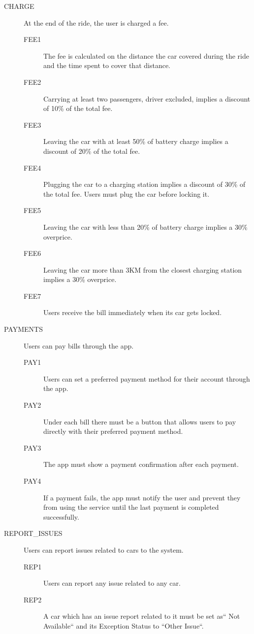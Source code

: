 \documentclass[11pt]{article} %
\begin{document}
\begin{description}
 	\item[CHARGE] At the end of the ride, the user is charged a fee.
	\begin{description}
	\item[FEE1] The fee is calculated on the distance the car covered during the ride and the time spent to cover that distance.
	\item[FEE2] Carrying at least two passengers, driver excluded, implies a discount of 10\% of the total fee.
	\item[FEE3] Leaving the car with at least 50\% of battery charge implies a discount of 20\% of the total fee.
	\item[FEE4] Plugging the car to a charging station implies a discount of 30\% of the total fee. Users must plug the car before locking it.
	\item[FEE5] Leaving the car with less than 20\% of battery charge implies a 30\% overprice.
	\item[FEE6] Leaving the car more than 3KM from the closest charging station implies a 30\% overprice.
	\item[FEE7] Users receive the bill immediately when its car gets locked.
	\end{description}

	\item[PAYMENTS] Users can pay bills through the app.
	\begin{description}	
	\item[PAY1] Users can set a preferred payment method for their account through the app.
	\item[PAY2] Under each bill there must be a button that allows users to pay directly with their preferred payment method.
	\item[PAY3] The app must show a payment confirmation after each payment.
	\item[PAY4] If a payment fails, the app must notify the user and prevent they from using the service until the last payment is completed successfully.
	\end{description}

	\item[REPORT\_ISSUES] Users can report issues related to cars to the system.
	\begin{description}
	\item[REP1] Users can report any issue related to any car.
	\item[REP2] A car which has an issue report related to it must be set as`` Not Available`` and its Exception Status to ``Other Issue``.
	\end{description}


\end{description}
\end{document}
